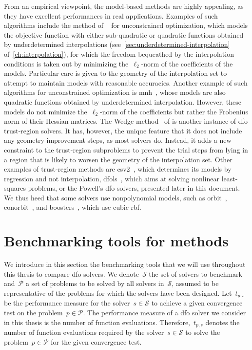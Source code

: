From an empirical viewpoint, the model-based methods are highly appealing, as they have excellent performances in real applications.
Examples of such algorithms include the method of \citeauthor{Conn_Toint_1996}~\cite{Conn_Toint_1996} for unconstrained optimization, which models the objective function with either sub-quadratic or quadratic functions obtained by underdetermined interpolations (see~\cref{sec:underdetermined-interpolation} of~\cref{ch:interpolation}), for which the freedom bequeathed by the interpolation conditions is taken out by minimizing the~$\ell_2$-norm of the coefficients of the models.
Particular care is given to the geometry of the interpolation set to attempt to maintain models with reasonable accuracies.
Another example of such algorithms for unconstrained optimization is \gls{mnh}~\cite{Wild_2008}, whose models are also quadratic functions obtained by underdetermined interpolation.
However, these models do not minimize the~$\ell_2$-norm of the coefficients but rather the Frobenius norm of their Hessian matrices.
The Wedge method~\cite{Marazzi_Nocedal_2002} of \citeauthor{Marazzi_Nocedal_2002} is another instance of \gls{dfo} trust-region solvers.
It has, however, the unique feature that it does not include any geometry-improvement steps, as most solvers do.
Instead, it adds a new constraint to the trust-region subproblems to prevent the trial steps from lying in a region that is likely to worsen the geometry of the interpolation set.
Other examples of trust-region methods are \gls{csv2}~\cite{Billups_Larson_Graf_2013}, which determines its models by regression and not interpolation, \gls{dfols}~\cite{Cartis_Etal_2019}, which aims at solving nonlinear least-squares problems, or the Powell's \gls{dfo} solvers, presented later in this document.
We thus heed that some solvers use nonpolynomial models, such as \gls{orbit}~\cite{Wild_Regis_Shoemaker_2008}, \gls{conorbit}~\cite{Regis_Wild_2017}, and \gls{boosters}~\cite{Oeuvray_Bierlaire_2009}, which use cubic \gls{rbf}.

\section{Benchmarking tools for  methods}

We introduce in this section the benchmarking tools that we will use throughout this thesis to compare \gls{dfo} solvers.
We denote~$\mathcal{S}$ the set of solvers to benchmark and~$\mathcal{P}$ a set of problems to be solved by all solvers in~$\mathcal{S}$, assumed to be representative of the problems for which the solvers have been designed.
Let~$t_{p, s}$ be the performance measure for the solver~$s \in \mathcal{S}$ to achieve a given convergence test on the problem~$p \in \mathcal{P}$.
The performance measure of a \gls{dfo} solver we consider in this thesis is the number of function evaluations.
Therefore,~$t_{p, s}$ denotes the number of function evaluations required by the solver~$s \in \mathcal{S}$ to solve the problem~$p \in \mathcal{P}$ for the given convergence test.

